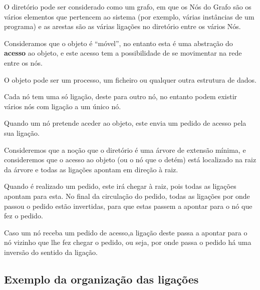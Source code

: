 O diretório pode ser considerado como um grafo, em que os Nós do Grafo são os vários elementos que pertencem ao sistema (por exemplo, várias instâncias de um programa) e as arestas são as várias ligações no diretório entre os vários Nós.

Consideramos que o objeto é ``móvel'', no entanto esta é uma abstração do \textbf{acesso} ao objeto, e este acesso tem a possibilidade de se movimentar na rede entre os nós.

O objeto pode ser um processo, um ficheiro ou qualquer outra estrutura de dados.

Cada nó tem uma só ligação, deste para outro nó, no entanto podem existir vários nós com ligação a um único nó.


Quando um nó pretende aceder ao objeto, este envia um pedido de acesso pela sua ligação. 



Consideremos que a noção que o diretório é uma árvore de extensão mínima, e consideremos que o acesso ao objeto (ou o nó que o detém) está localizado na raiz da árvore e todas as ligações apontam em direção à raiz.

Quando é realizado um pedido, este irá chegar à raiz, pois todas as ligações apontam para esta. No final da circulação do pedido, todas as ligações por onde passou o pedido estão invertidas, para que estas passem a apontar para o nó que fez o pedido.

Caso um nó receba um pedido de acesso,a ligação deste passa a apontar para o nó vizinho que lhe fez chegar o pedido, ou seja, por onde passa o pedido há uma inversão do sentido da ligação.



\subsection*{Exemplo da organização das ligações}

